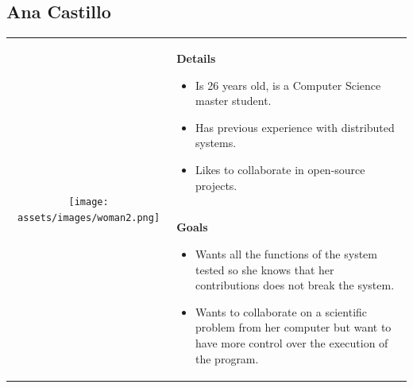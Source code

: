 \subsection*{Ana Castillo}
\begin{table}[h]
\begin{tabular}{c p{}}
\multirow{2}{*}{
      \texttt{[image: assets/images/woman2.png]}
} 
& 
\multicolumn{1}{p{0.7\textwidth}}{
\textbf{Details}
\begin{itemize}
	\item Is 26 years old, is a Computer Science master student.
	\item Has previous experience with distributed systems.
	\item Likes to collaborate in open-source projects.
\end{itemize}
} \\
&
\textbf{Goals} 
\begin{itemize}
	\item Wants all the functions of the system tested so she knows that her contributions does not break the system.
	
	\item Wants to collaborate on a scientific problem from her computer but want to have more control over the execution of the program.
\end{itemize}   
\end{tabular}
\end{table}


